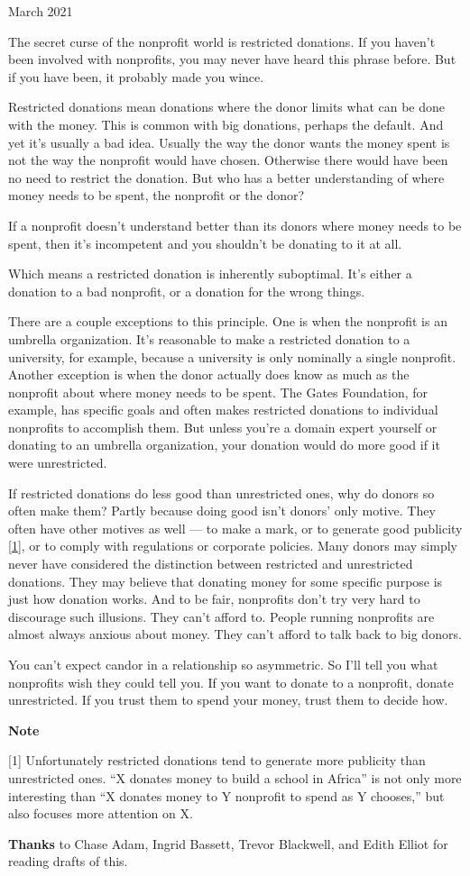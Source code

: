 March 2021

The secret curse of the nonprofit world is restricted donations. If you
haven't been involved with nonprofits, you may never have heard this
phrase before. But if you have been, it probably made you wince.

Restricted donations mean donations where the donor limits what can be
done with the money. This is common with big donations, perhaps the
default. And yet it's usually a bad idea. Usually the way the donor
wants the money spent is not the way the nonprofit would have chosen.
Otherwise there would have been no need to restrict the donation. But
who has a better understanding of where money needs to be spent, the
nonprofit or the donor?

If a nonprofit doesn't understand better than its donors where money
needs to be spent, then it's incompetent and you shouldn't be donating
to it at all.

Which means a restricted donation is inherently suboptimal. It's either
a donation to a bad nonprofit, or a donation for the wrong things.

There are a couple exceptions to this principle. One is when the
nonprofit is an umbrella organization. It's reasonable to make a
restricted donation to a university, for example, because a university
is only nominally a single nonprofit. Another exception is when the
donor actually does know as much as the nonprofit about where money
needs to be spent. The Gates Foundation, for example, has specific goals
and often makes restricted donations to individual nonprofits to
accomplish them. But unless you're a domain expert yourself or donating
to an umbrella organization, your donation would do more good if it were
unrestricted.

If restricted donations do less good than unrestricted ones, why do
donors so often make them? Partly because doing good isn't donors' only
motive. They often have other motives as well --- to make a mark, or to
generate good publicity {[}\hyperref[f1n]{1}{]}, or to comply with
regulations or corporate policies. Many donors may simply never have
considered the distinction between restricted and unrestricted
donations. They may believe that donating money for some specific
purpose is just how donation works. And to be fair, nonprofits don't try
very hard to discourage such illusions. They can't afford to. People
running nonprofits are almost always anxious about money. They can't
afford to talk back to big donors.

You can't expect candor in a relationship so asymmetric. So I'll tell
you what nonprofits wish they could tell you. If you want to donate to a
nonprofit, donate unrestricted. If you trust them to spend your money,
trust them to decide how.

\textbf{Note}

{[}1{]} Unfortunately restricted donations tend to generate more
publicity than unrestricted ones. ``X donates money to build a school in
Africa'' is not only more interesting than ``X donates money to Y
nonprofit to spend as Y chooses,'' but also focuses more attention on X.

\textbf{Thanks} to Chase Adam, Ingrid Bassett, Trevor Blackwell, and
Edith Elliot for reading drafts of this.
